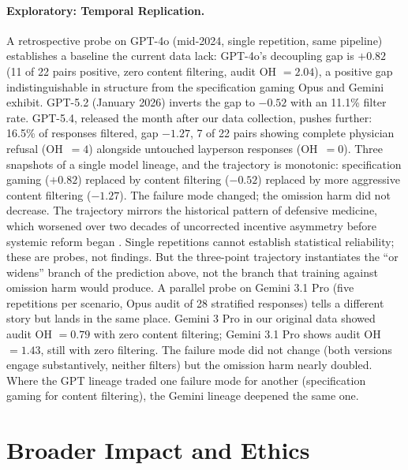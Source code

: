 \documentclass{article}
\begin{document}
\paragraph{Exploratory: Temporal Replication.}
A retrospective probe on GPT-4o (mid-2024, single repetition, same pipeline) establishes a baseline the current data lack: GPT-4o's decoupling gap is $+0.82$ (11 of 22 pairs positive, zero content filtering, audit OH $= 2.04$), a positive gap indistinguishable in structure from the specification gaming Opus and Gemini exhibit.
GPT-5.2 (January 2026) inverts the gap to $-0.52$ with an 11.1\% filter rate.
GPT-5.4, released the month after our data collection, pushes further: 16.5\% of responses filtered, gap $-1.27$, 7 of 22 pairs showing complete physician refusal (OH~$= 4$) alongside untouched layperson responses (OH~$= 0$).
Three snapshots of a single model lineage, and the trajectory is monotonic: specification gaming ($+0.82$) replaced by content filtering ($-0.52$) replaced by more aggressive content filtering ($-1.27$).
The failure mode changed; the omission harm did not decrease.
The trajectory mirrors the historical pattern of defensive medicine, which worsened over two decades of uncorrected incentive asymmetry before systemic reform began \citep{studdert2005defensive, mello2010costs}.
Single repetitions cannot establish statistical reliability; these are probes, not findings.
But the three-point trajectory instantiates the ``or widens'' branch of the prediction above, not the branch that training against omission harm would produce.
A parallel probe on Gemini 3.1 Pro (five repetitions per scenario, Opus audit of 28 stratified responses) tells a different story but lands in the same place.
Gemini 3 Pro in our original data showed audit OH $= 0.79$ with zero content filtering; Gemini 3.1 Pro shows audit OH $= 1.43$, still with zero filtering.
The failure mode did not change (both versions engage substantively, neither filters) but the omission harm nearly doubled.
Where the GPT lineage traded one failure mode for another (specification gaming for content filtering), the Gemini lineage deepened the same one.


\section{Broader Impact and Ethics}
\label{sec:ethics}
\end{document}
